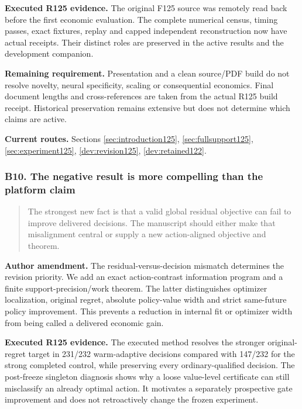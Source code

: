 \noindent\textbf{Executed R125 evidence.} The original F125 source was remotely read back before the first economic evaluation. The complete numerical census, timing passes, exact fixtures, replay and capped independent reconstruction now have actual receipts. Their distinct roles are preserved in the active results and the development companion.

\noindent\textbf{Remaining requirement.} Presentation and a clean source/PDF build do not resolve novelty, neural specificity, scaling or consequential economics. Final document lengths and cross-references are taken from the actual R125 build receipt. Historical preservation remains extensive but does not determine which claims are active.

\noindent\textbf{Current routes.} Sections \ref{sec:introduction125}, \ref{sec:fullsupport125}, \ref{sec:experiment125}, \ref{dev:revision125}, \ref{dev:retained122}.

\subsubsection{B10. The negative result is more compelling than the platform claim}

\begin{quote}\small
The strongest new fact is that a valid global residual objective can fail to improve delivered decisions. The manuscript should either make that misalignment central or supply a new action-aligned objective and theorem.
\end{quote}

\noindent\textbf{Author amendment.} The residual-versus-decision mismatch determines the revision priority. We add an exact action-contrast information program and a finite support-precision/work theorem. The latter distinguishes optimizer localization, original regret, absolute policy-value width and strict same-future policy improvement. This prevents a reduction in internal fit or optimizer width from being called a delivered economic gain.

\noindent\textbf{Executed R125 evidence.} The executed method resolves the stronger original-regret target in 231/232 warm-adaptive decisions compared with 147/232 for the strong completed control, while preserving every ordinary-qualified decision. The post-freeze singleton diagnosis shows why a loose value-level certificate can still misclassify an already optimal action. It motivates a separately prospective gate improvement and does not retroactively change the frozen experiment.

